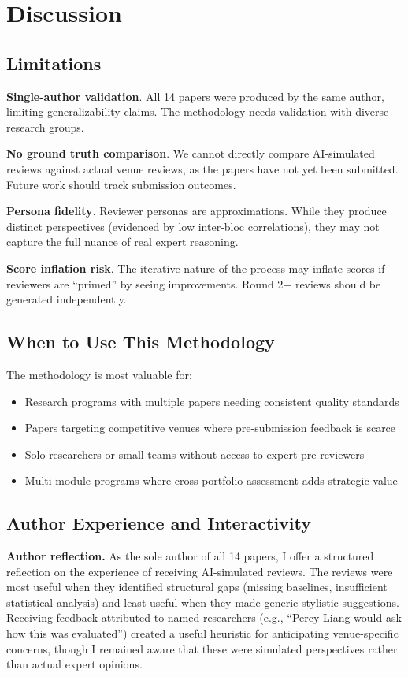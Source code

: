 \section{Discussion}

\subsection{Limitations}

\textbf{Single-author validation}. All 14 papers were produced by the same author, limiting generalizability claims. The methodology needs validation with diverse research groups.

\textbf{No ground truth comparison}. We cannot directly compare AI-simulated reviews against actual venue reviews, as the papers have not yet been submitted. Future work should track submission outcomes.

\textbf{Persona fidelity}. Reviewer personas are approximations. While they produce distinct perspectives (evidenced by low inter-bloc correlations), they may not capture the full nuance of real expert reasoning.

\textbf{Score inflation risk}. The iterative nature of the process may inflate scores if reviewers are ``primed'' by seeing improvements. Round 2+ reviews should be generated independently.

\subsection{When to Use This Methodology}

The methodology is most valuable for:
\begin{itemize}
    \item Research programs with multiple papers needing consistent quality standards
    \item Papers targeting competitive venues where pre-submission feedback is scarce
    \item Solo researchers or small teams without access to expert pre-reviewers
    \item Multi-module programs where cross-portfolio assessment adds strategic value
\end{itemize}

\subsection{Author Experience and Interactivity}

\textbf{Author reflection.} As the sole author of all 14 papers, I offer a structured reflection on the experience of receiving AI-simulated reviews. The reviews were most useful when they identified structural gaps (missing baselines, insufficient statistical analysis) and least useful when they made generic stylistic suggestions. Receiving feedback attributed to named researchers (e.g., ``Percy Liang would ask how this was evaluated'') created a useful heuristic for anticipating venue-specific concerns, though I remained aware that these were simulated perspectives rather than actual expert opinions.

